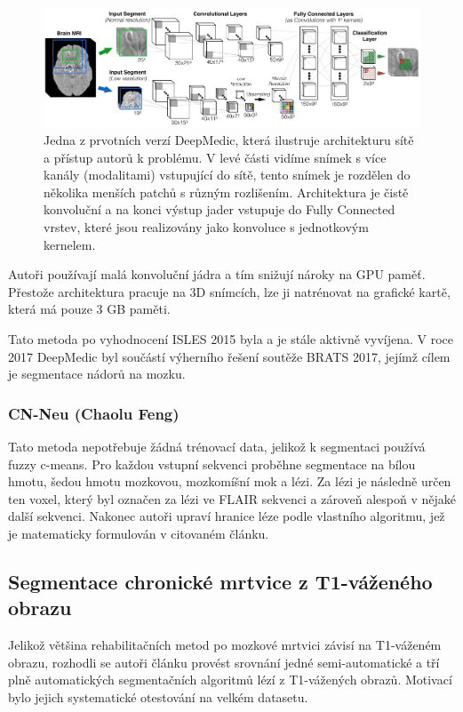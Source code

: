 \documentclass[11pt]{article}
\begin{document}
\begin{figure}[htp]
	\centering
	\includegraphics[width=\textwidth]{DeepMedic}
	\caption{Jedna z prvotních verzí DeepMedic, která ilustruje architekturu sítě a přístup autorů k problému. V levé části vidíme snímek s více kanály (modalitami) vstupující do sítě, tento snímek je rozdělen do několika menších patchů s různým rozlišením. Architektura je čistě konvoluční a na konci výstup jader vstupuje do Fully Connected vrstev, které jsou realizovány jako konvoluce s jednotkovým kernelem.}
	\label{img-DeepMedic}
\end{figure}

Autoři používají malá konvoluční jádra a tím snižují nároky na GPU paměť. Přestože architektura pracuje na 3D snímcích, lze ji natrénovat na grafické kartě, která má pouze 3 GB paměti.

Tato metoda po vyhodnocení ISLES 2015 byla a je stále aktivně vyvíjena. V roce 2017 DeepMedic byl součástí výherního řešení soutěže BRATS 2017, jejímž cílem je segmentace nádorů na mozku. \cite{Kamnitsas_2017, kamnitsas2017ensembles}

\subsubsection{CN-Neu (Chaolu Feng) \cite{cn-neu}}
\label{lbl-cnNeu}
Tato metoda nepotřebuje žádná trénovací data, jelikož k segmentaci používá fuzzy c-means. Pro každou vstupní sekvenci proběhne segmentace na bílou hmotu, šedou hmotu mozkovou, mozkomíšní mok a lézi. Za lézi je následně určen ten voxel, který byl označen za lézi ve FLAIR sekvenci a zároveň alespoň v nějaké další sekvenci. Nakonec autoři upraví hranice léze podle vlastního algoritmu, jež je matematicky formulován v citovaném článku.

\subsection{Segmentace chronické mrtvice z T1-váženého obrazu}
Jelikož většina rehabilitačních metod po mozkové mrtvici závisí na T1-váženém obrazu, rozhodli se autoři článku \cite{Ito2018} provést srovnání jedné semi-automatické a tří plně automatických segmentačních algoritmů lézí z T1-vážených obrazů. Motivací bylo jejich systematické otestování na velkém datasetu.
\end{document}
